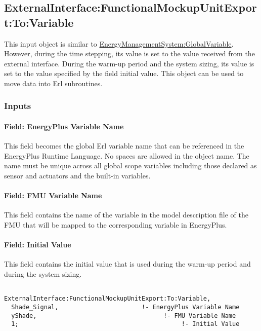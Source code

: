 \subsection{ExternalInterface:FunctionalMockupUnitExport:To:Variable}\label{externalinterfacefunctionalmockupunitexporttovariable}

This input object is similar to \hyperref[energymanagementsystemglobalvariable]{EnergyManagementSystem:GlobalVariable}. However, during the time stepping, its value is set to the value received from the external interface. During the warm-up period and the system sizing, its value is set to the value specified by the field initial value. This object can be used to move data into Erl subroutines.

\subsubsection{Inputs}\label{inputs-12-004}

\paragraph{Field: EnergyPlus Variable Name}\label{field-energyplus-variable-name-7}

This field becomes the global Erl variable name that can be referenced in the EnergyPlus Runtime Language. No spaces are allowed in the object name. The name must be unique across all global scope variables including those declared as sensor and actuators and the built-in variables.

\paragraph{Field: FMU Variable Name}\label{field-fmu-variable-name-7}

This field contains the name of the variable in the model description file of the FMU that will be mapped to the corresponding variable in EnergyPlus.

\paragraph{Field: Initial Value}\label{field-initial-value-8}

This field contains the initial value that is used during the warm-up period and during the system sizing.

\begin{lstlisting}

ExternalInterface:FunctionalMockupUnitExport:To:Variable,
  Shade_Signal,                       !- EnergyPlus Variable Name
  yShade,                                   !- FMU Variable Name
  1;                                             !- Initial Value
\end{lstlisting}